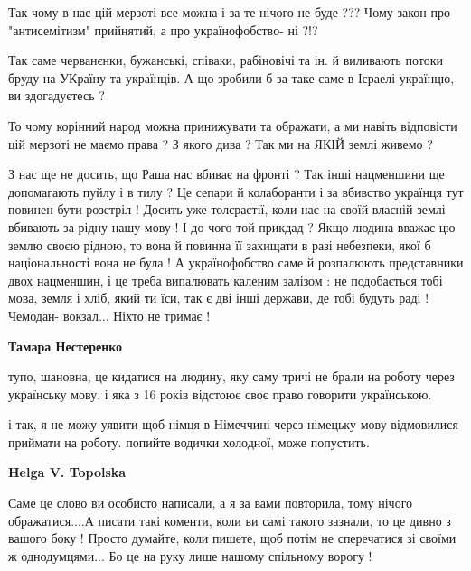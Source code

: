 \begin{itemize}
\begin{itemize}
\begin{itemize}
Так чому в нас цій мерзоті все можна і за те нічого не буде ??? Чому закон про
"антисемітизм" прийнятий, а про українофобство- ні ?!?

Так саме черванєнки, бужанські, співаки, рабіновічі та ін. й виливають потоки
бруду на УКраїну та українців. А що зробили б за таке саме в Ісраелі українцю,
ви здогадуєтесь ? 

То чому корінний народ можна принижувати та ображати, а ми навіть відповісти
цій мерзоті не маємо права ? З якого дива ? Так ми на ЯКІЙ землі живемо ? 

З нас ще не досить, що Раша нас вбиває на фронті ? Так інші нацменшини ще
допомагають пуйлу і в тилу ? Це сепари й колаборанти і за вбивство українця тут
повинен бути розстріл ! Досить уже толєрастії, коли нас на своїй власній землі
вбивають за рідну нашу мову ! І до чого той прикдад ?  Якщо людина вважає цю
землю своєю рідною, то вона й повинна її захищати в разі небезпеки, якої б
національності вона не була ! А українофобство саме й розпалюють представники
двох нацменшин, і це треба випалювать каленим залізом : не подобається тобі
мова, земля і хліб, який ти їси, так є дві інші держави, де тобі будуть раді !
Чемодан- вокзал... Ніхто не тримає !

 
\textbf{Тамара Нестеренко} 

тупо, шановна, це кидатися на людину, яку саму тричі не брали на роботу через
українську мову. і яка з 16 років відстоює своє право говорити українською.

і так, я не можу уявити щоб німця в Німеччині через німецьку мову відмовилися
приймати на роботу. попийте водички холодної, може попустить.


 
\textbf{Helga V. Topolska} 

Саме це слово ви особисто написали, а я за вами повторила, тому нічого
ображатися....А писати такі коменти, коли ви самі такого зазнали, то це дивно з
вашого боку ! Просто думайте, коли пишете, щоб потім не сперечатися зі своїми ж
однодумцями... Бо це на руку лише нашому спільному ворогу ! 


\end{itemize}
\end{itemize}
\end{itemize}
